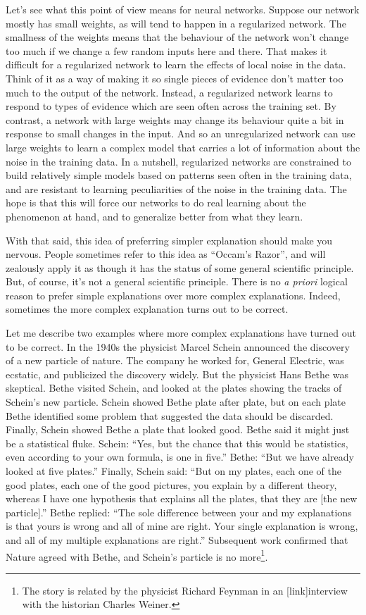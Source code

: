\documentclass[a4paper,twoside,10pt]{book}
\begin{document}
Let's see what this point of view means for neural networks. Suppose our network mostly has small weights, as will tend to happen in a regularized network. The smallness of the weights means that the behaviour of the network won't change too much if we change a few random inputs here and there. That makes it difficult for a regularized network to learn the effects of local noise in the data. Think of it as a way of making it so single pieces of evidence don't matter too much to the output of the network. Instead, a regularized network learns to respond to types of evidence which are seen often across the training set. By contrast, a network with large weights may change its behaviour quite a bit in response to small changes in the input. And so an unregularized network can use large weights to learn a complex model that carries a lot of information about the noise in the training data. In a nutshell, regularized networks are constrained to build relatively simple models based on patterns seen often in the training data, and are resistant to learning peculiarities of the noise in the training data. The hope is that this will force our networks to do real learning about the phenomenon at hand, and to generalize better from what they learn.

With that said, this idea of preferring simpler explanation should make you nervous. People sometimes refer to this idea as ``Occam's Razor'', and will zealously apply it as though it has the status of some general scientific principle. But, of course, it's not a general scientific principle. There is no \textit{a priori} logical reason to prefer simple explanations over more complex explanations. Indeed, sometimes the more complex explanation turns out to be correct.

Let me describe two examples where more complex explanations have turned out to be correct. In the 1940s the physicist Marcel Schein announced the discovery of a new particle of nature. The company he worked for, General Electric, was ecstatic, and publicized the discovery widely. But the physicist Hans Bethe was skeptical. Bethe visited Schein, and looked at the plates showing the tracks of Schein's new particle. Schein showed Bethe plate after plate, but on each plate Bethe identified some problem that suggested the data should be discarded. Finally, Schein showed Bethe a plate that looked good. Bethe said it might just be a statistical fluke. Schein: ``Yes, but the chance that this would be statistics, even according to your own formula, is one in five.'' Bethe: ``But we have already looked at five plates.'' Finally, Schein said: ``But on my plates, each one of the good plates, each one of the good pictures, you explain by a different theory, whereas I have one hypothesis that explains all the plates, that they are [the new particle].'' Bethe replied: ``The sole difference between your and my explanations is that yours is wrong and all of mine are right. Your single explanation is wrong, and all of my multiple explanations are right.'' Subsequent work confirmed that Nature agreed with Bethe, and Schein's particle is no more\footnote{The story is related by the physicist Richard Feynman in an [link]interview with the historian Charles Weiner.}.
\end{document}
